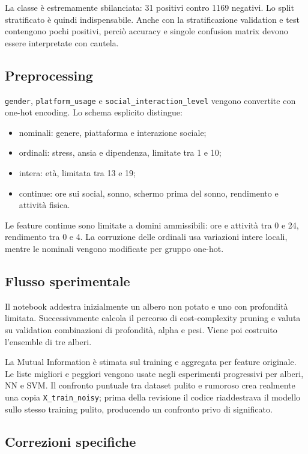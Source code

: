 \documentclass[11pt,a4paper]{article}
\begin{document}
La classe è estremamente sbilanciata: 31 positivi contro 1169 negativi. Lo split stratificato è quindi indispensabile. Anche con la stratificazione validation e test contengono pochi positivi, perciò accuracy e singole confusion matrix devono essere interpretate con cautela.

\subsection{Preprocessing}

\texttt{gender}, \texttt{platform\_usage} e \texttt{social\_interaction\_level} vengono convertite con one-hot encoding. Lo schema esplicito distingue:
\begin{itemize}
    \item nominali: genere, piattaforma e interazione sociale;
    \item ordinali: stress, ansia e dipendenza, limitate tra 1 e 10;
    \item intera: età, limitata tra 13 e 19;
    \item continue: ore sui social, sonno, schermo prima del sonno, rendimento e attività fisica.
\end{itemize}

Le feature continue sono limitate a domini ammissibili: ore e attività tra 0 e 24, rendimento tra 0 e 4. La corruzione delle ordinali usa variazioni intere locali, mentre le nominali vengono modificate per gruppo one-hot.

\subsection{Flusso sperimentale}

Il notebook addestra inizialmente un albero non potato e uno con profondità limitata. Successivamente calcola il percorso di cost-complexity pruning e valuta su validation combinazioni di profondità, alpha e pesi. Viene poi costruito l'ensemble di tre alberi.

La Mutual Information è stimata sul training e aggregata per feature originale. Le liste migliori e peggiori vengono usate negli esperimenti progressivi per alberi, NN e SVM. Il confronto puntuale tra dataset pulito e rumoroso crea realmente una copia \texttt{X\_train\_noisy}; prima della revisione il codice riaddestrava il modello sullo stesso training pulito, producendo un confronto privo di significato.

\subsection{Correzioni specifiche}
\end{document}
